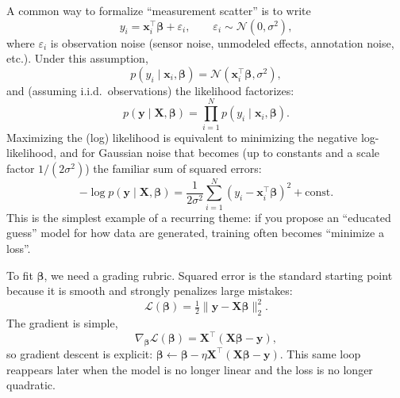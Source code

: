 \smallskip
\noindent A common way to formalize ``measurement scatter'' is to write
\begin{equation}
    y_i = \mathbf{x}_i^\top\boldsymbol{\beta} + \varepsilon_i,
    \qquad \varepsilon_i \sim \mathcal{N}(0,\sigma^2),
\label{eq:linear_regression_noise_model}
\end{equation}
where \(\varepsilon_i\) is observation noise (sensor noise, unmodeled effects, annotation noise, etc.). Under this assumption,
\begin{equation}
    p(y_i\mid \mathbf{x}_i,\boldsymbol{\beta})=\mathcal{N}(\mathbf{x}_i^\top\boldsymbol{\beta},\sigma^2),
\label{eq:linear_regression_likelihood}
\end{equation}
and (assuming i.i.d.\ observations) the likelihood factorizes:
\begin{equation}
    p(\mathbf{y}\mid \mathbf{X},\boldsymbol{\beta})=\prod_{i=1}^N p(y_i\mid \mathbf{x}_i,\boldsymbol{\beta}).
\label{eq:linear_regression_iid_likelihood}
\end{equation}
Maximizing the (log) likelihood is equivalent to minimizing the negative log-likelihood, and for Gaussian noise that becomes (up to constants and a scale factor \(1/(2\sigma^2)\)) the familiar sum of squared errors:
\begin{equation}
    -\log p(\mathbf{y}\mid \mathbf{X},\boldsymbol{\beta})
    = \frac{1}{2\sigma^2}\sum_{i=1}^N (y_i-\mathbf{x}_i^\top\boldsymbol{\beta})^2 + \text{const}.
\label{eq:gaussian_nll_sse}
\end{equation}
This is the simplest example of a recurring theme: if you propose an ``educated guess'' model for how data are generated, training often becomes ``minimize a loss''.

\smallskip
\noindent To fit \(\boldsymbol{\beta}\), we need a grading rubric. Squared error is the standard starting point because it is smooth and strongly penalizes large mistakes:
\begin{equation}
    \mathcal{L}(\boldsymbol{\beta}) = \tfrac{1}{2}\|\mathbf{y}-\mathbf{X}\boldsymbol{\beta}\|_2^2.
\label{eq:sse_objective}
\end{equation}
The gradient is simple,
\begin{equation}
    \nabla_{\boldsymbol{\beta}}\mathcal{L}(\boldsymbol{\beta}) = \mathbf{X}^\top(\mathbf{X}\boldsymbol{\beta}-\mathbf{y}),
\label{eq:sse_gradient}
\end{equation}
so gradient descent is explicit: \(\boldsymbol{\beta}\leftarrow \boldsymbol{\beta}-\eta \mathbf{X}^\top(\mathbf{X}\boldsymbol{\beta}-\mathbf{y})\). This same loop reappears later when the model is no longer linear and the loss is no longer quadratic.

